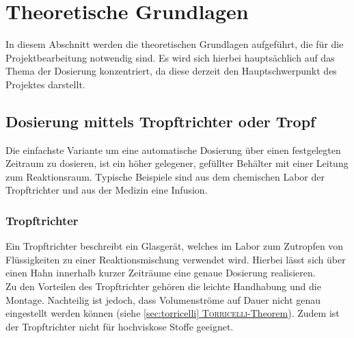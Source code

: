 \section{Theoretische Grundlagen}
\label{sec:physik}
In diesem Abschnitt werden die theoretischen Grundlagen aufgeführt, die für die Projektbearbeitung notwendig sind. Es wird sich hierbei hauptsächlich auf das Thema der Dosierung konzentriert, da diese derzeit den Hauptschwerpunkt des Projektes darstellt.

\subsection{Dosierung mittels Tropftrichter oder Tropf}
Die einfachste Variante um eine automatische Dosierung über einen festgelegten Zeitraum zu dosieren, ist ein höher gelegener, gefüllter Behälter mit einer Leitung zum Reaktionsraum. Typische Beispiele sind aus dem chemischen Labor der Tropftrichter und aus der Medizin eine Infusion. 

\subsubsection*{Tropftrichter}
Ein Tropftrichter beschreibt ein Glasgerät, welches im Labor zum Zutropfen von Flüssigkeiten zu einer Reaktionsmischung verwendet wird. Hierbei lässt sich über einen Hahn innerhalb kurzer Zeiträume eine genaue Dosierung realisieren. \cite{Hunig.2006}\\
Zu den Vorteilen des Tropftrichter gehören die leichte Handhabung und die Montage. Nachteilig ist jedoch, dass Volumenströme auf Dauer nicht genau eingestellt werden können (siehe \hyperref[sec:torricelli]{\ref{sec:torricelli} \textsc{Torricelli}-Theorem}). Zudem ist der Tropftrichter nicht für hochviskose Stoffe geeignet.

